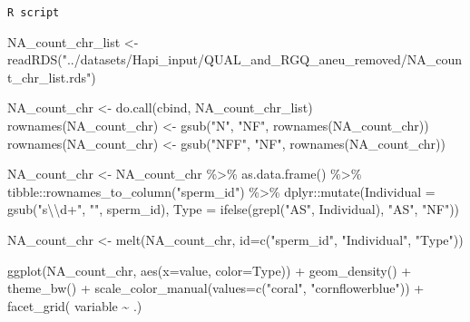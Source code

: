 \documentclass[
  letterpaper,
  DIV=11,
  numbers=noendperiod]{scrreprt}
\newenvironment{Shaded}{\begin{snugshade}}{\end{snugshade}}
\newcommand{\AttributeTok}[1]{\textcolor[rgb]{0.40,0.45,0.13}{#1}}
\newcommand{\FunctionTok}[1]{\textcolor[rgb]{0.28,0.35,0.67}{#1}}
\newcommand{\NormalTok}[1]{\textcolor[rgb]{0.00,0.23,0.31}{#1}}
\newcommand{\OtherTok}[1]{\textcolor[rgb]{0.00,0.23,0.31}{#1}}
\newcommand{\SpecialCharTok}[1]{\textcolor[rgb]{0.37,0.37,0.37}{#1}}
\newcommand{\StringTok}[1]{\textcolor[rgb]{0.13,0.47,0.30}{#1}}
\begin{document}
\begin{codelisting}

\caption{\texttt{R script}}

\begin{Shaded}
\begin{Highlighting}[]
\NormalTok{NA\_count\_chr\_list }\OtherTok{\textless{}{-}} \FunctionTok{readRDS}\NormalTok{(}\StringTok{"../datasets/Hapi\_input/QUAL\_and\_RGQ\_aneu\_removed/NA\_count\_chr\_list.rds"}\NormalTok{)}
  
\NormalTok{NA\_count\_chr }\OtherTok{\textless{}{-}} \FunctionTok{do.call}\NormalTok{(cbind, NA\_count\_chr\_list)}
\FunctionTok{rownames}\NormalTok{(NA\_count\_chr) }\OtherTok{\textless{}{-}} \FunctionTok{gsub}\NormalTok{(}\StringTok{"N"}\NormalTok{, }\StringTok{"NF"}\NormalTok{, }\FunctionTok{rownames}\NormalTok{(NA\_count\_chr))}
\FunctionTok{rownames}\NormalTok{(NA\_count\_chr) }\OtherTok{\textless{}{-}} \FunctionTok{gsub}\NormalTok{(}\StringTok{"NFF"}\NormalTok{, }\StringTok{"NF"}\NormalTok{, }\FunctionTok{rownames}\NormalTok{(NA\_count\_chr))}

\NormalTok{NA\_count\_chr }\OtherTok{\textless{}{-}}\NormalTok{ NA\_count\_chr }\SpecialCharTok{\%\textgreater{}\%} \FunctionTok{as.data.frame}\NormalTok{() }\SpecialCharTok{\%\textgreater{}\%}\NormalTok{ tibble}\SpecialCharTok{::}\FunctionTok{rownames\_to\_column}\NormalTok{(}\StringTok{"sperm\_id"}\NormalTok{) }\SpecialCharTok{\%\textgreater{}\%} 
\NormalTok{  dplyr}\SpecialCharTok{::}\FunctionTok{mutate}\NormalTok{(}\AttributeTok{Individual =} \FunctionTok{gsub}\NormalTok{(}\StringTok{"s}\SpecialCharTok{\textbackslash{}\textbackslash{}}\StringTok{d+"}\NormalTok{, }\StringTok{""}\NormalTok{, sperm\_id), }\AttributeTok{Type =} \FunctionTok{ifelse}\NormalTok{(}\FunctionTok{grepl}\NormalTok{(}\StringTok{"AS"}\NormalTok{, Individual), }\StringTok{"AS"}\NormalTok{, }\StringTok{"NF"}\NormalTok{))}

\NormalTok{NA\_count\_chr }\OtherTok{\textless{}{-}} \FunctionTok{melt}\NormalTok{(NA\_count\_chr, }\AttributeTok{id=}\FunctionTok{c}\NormalTok{(}\StringTok{"sperm\_id"}\NormalTok{, }\StringTok{"Individual"}\NormalTok{, }\StringTok{"Type"}\NormalTok{))}

\FunctionTok{ggplot}\NormalTok{(NA\_count\_chr, }\FunctionTok{aes}\NormalTok{(}\AttributeTok{x=}\NormalTok{value, }\AttributeTok{color=}\NormalTok{Type)) }\SpecialCharTok{+}
  \FunctionTok{geom\_density}\NormalTok{() }\SpecialCharTok{+} \FunctionTok{theme\_bw}\NormalTok{() }\SpecialCharTok{+} 
  \FunctionTok{scale\_color\_manual}\NormalTok{(}\AttributeTok{values=}\FunctionTok{c}\NormalTok{(}\StringTok{"coral"}\NormalTok{, }\StringTok{"cornflowerblue"}\NormalTok{)) }\SpecialCharTok{+} 
  \FunctionTok{facet\_grid}\NormalTok{( variable }\SpecialCharTok{\textasciitilde{}}\NormalTok{ .)}


\end{Highlighting}
\end{Shaded}
\end{codelisting}
\end{document}
